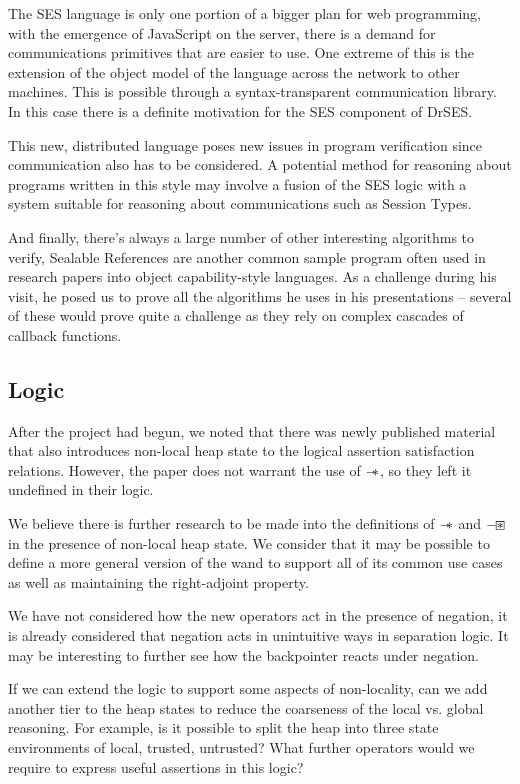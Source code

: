 \documentclass[a4paper,notitlepage]{report}
\begin{document}
The SES language is only one portion of a bigger plan for web programming, with
the emergence of JavaScript on the server, there is a demand for communications
primitives that are easier to use. One extreme of this is the extension of the
object model of the language across the network to other machines. This is
possible through a syntax-transparent communication library. In this case there
is a definite motivation for the SES component of DrSES.

This new, distributed language poses new issues in program verification since
communication also has to be considered. A potential method for reasoning about
programs written in this style may involve a fusion of the SES logic with a
system suitable for reasoning about communications such as Session Types.

And finally, there's always a large number of other interesting algorithms to
verify, Sealable References are another common sample program often used in
research papers into object capability-style languages. As a challenge during
his visit, he posed us to prove all the algorithms he uses in his presentations
-- several of these would prove quite a challenge as they rely on complex
cascades of callback functions.

\subsection{Logic}
After the project had begun, we noted that there was newly published
material~\cite{Ley-Wild2013SAS} that also introduces non-local heap state to the
logical assertion satisfaction relations. However, the paper does not warrant
the use of $\mathbin{-\mkern-6mu *}$, so they left it undefined in their logic.

We believe there is further research to be made into the definitions of $\mathbin{-\mkern-6mu *}$
and $\mathbin{-\mkern-3mu \boxast}$ in the presence of non-local heap state. We consider that it may
be possible to define a more general version of the wand to support all of its
common use cases as well as maintaining the right-adjoint property.

We have not considered how the new operators act in the presence of negation, it
is already considered that negation acts in unintuitive ways in separation
logic. It may be interesting to further see how the backpointer reacts under
negation.

If we can extend the logic to support some aspects of non-locality, can we
add another tier to the heap states to reduce the coarseness of the local vs.
global reasoning. For example, is it possible to split the heap into three state
environments of local, trusted, untrusted? What further operators would we
require to express useful assertions in this logic?
\end{document}
